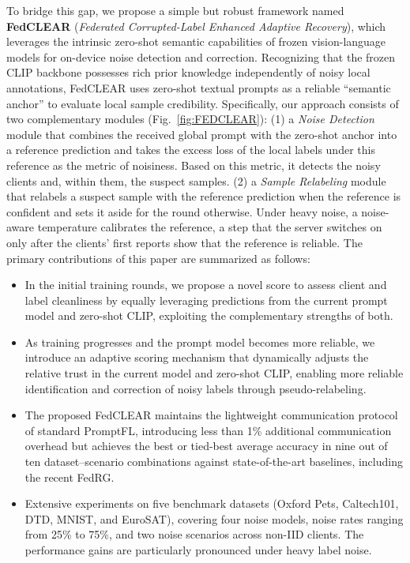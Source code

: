 \documentclass[runningheads]{llncs}
\begin{document}
To bridge this gap, we propose a simple but robust framework named \textbf{FedCLEAR}
(\textit{Federated Corrupted-Label Enhanced Adaptive Recovery}), which leverages the intrinsic
zero-shot semantic capabilities of frozen vision-language models for on-device noise detection and
correction. Recognizing that the frozen CLIP backbone possesses rich prior knowledge independently
of noisy local annotations, FedCLEAR uses zero-shot textual prompts as a reliable ``semantic anchor''
to evaluate local sample credibility. Specifically, our approach consists of two complementary
modules (Fig.~\ref{fig:FEDCLEAR}): (1) a \textit{Noise Detection} module that combines the received global prompt with the
zero-shot anchor into a reference prediction and takes the excess loss of the local labels under this
reference as the metric of noisiness. Based on this metric, it detects the noisy clients and, within
them, the suspect samples. (2) a \textit{Sample Relabeling} module that relabels a suspect sample with
the reference prediction when the reference is confident and sets it aside for the round otherwise.
Under heavy noise, a noise-aware temperature calibrates the reference, a step that the server switches
on only after the clients' first reports show that the reference is reliable. The primary
contributions of this paper are summarized as follows:
\begin{itemize}
    
\item In the initial training rounds, we propose a novel score to assess client and label cleanliness by equally leveraging predictions from the current prompt model and zero-shot CLIP, exploiting the complementary strengths of both.

\item As training progresses and the prompt model becomes more reliable, we introduce an adaptive scoring mechanism that dynamically adjusts the relative trust in the current model and zero-shot CLIP, enabling more reliable identification and correction of noisy labels through pseudo-relabeling.

\item The proposed FedCLEAR maintains the lightweight communication protocol of standard PromptFL, introducing less than 1\% additional communication overhead but achieves the best or tied-best average accuracy in nine out of ten dataset--scenario combinations against state-of-the-art baselines, including the recent FedRG.

\item Extensive experiments on five benchmark datasets (Oxford Pets, Caltech101, DTD, MNIST, and EuroSAT), covering four noise models, noise rates ranging from 25\% to 75\%, and two noise scenarios across non-IID clients. The performance gains are particularly pronounced under heavy label noise.

\end{itemize}
\end{document}

